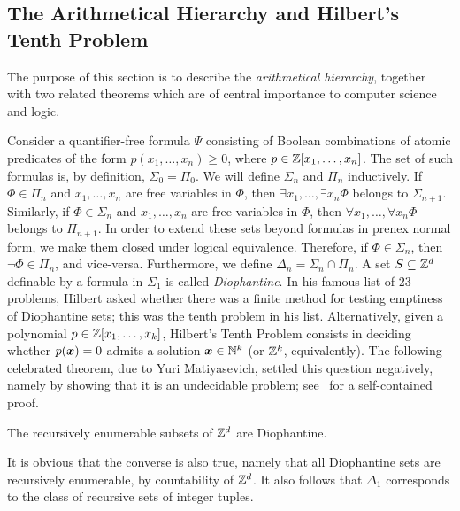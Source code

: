 \subsection{The Arithmetical Hierarchy and Hilbert's Tenth Problem}

The purpose of this section is to describe the \emph{arithmetical hierarchy}, together with two related theorems which are of central importance to computer science and logic.

Consider a quantifier-free formula $\Psi$ consisting of Boolean combinations of atomic predicates of the form $p(x_{1}, \ldots, x_{n}) \geq 0$, where $p \in \mathbb{Z}[x_{1}, \ldots, x_{n}]$.
The set of such formulas is, by definition, $\Sigma_{0}=\Pi_{0}$. We will define $\Sigma_{n}$ and $\Pi_{n}$ inductively.
If $\Phi \in \Pi_{n}$ and $x_{1}, \ldots, x_{n}$ are free variables in $\Phi$, then $\exists x_{1}, \ldots, \exists x_{n} \Phi$ belongs to $\Sigma_{n+1}$.
Similarly, if $\Phi \in \Sigma_{n}$ and $x_{1}, \ldots, x_{n}$ are free variables in $\Phi$, then $\forall x_{1}, \ldots, \forall x_{n} \Phi$ belongs to $\Pi_{n+1}$.
In order to extend these sets beyond formulas in prenex normal form, we make them closed under logical equivalence. Therefore, if $\Phi \in \Sigma_{n}$, then $\neg \Phi \in \Pi_{n}$, and vice-versa.
Furthermore, we define $\Delta_{n} = \Sigma_{n} \cap \Pi_{n}$.
A set $S \subseteq \mathbb{Z}^{d}$ definable by a formula in $\Sigma_{1}$ is called \emph{Diophantine}. In his famous list of 23 problems, Hilbert asked whether there was a finite method for testing emptiness of Diophantine sets; this was the tenth problem in his list. Alternatively, given a polynomial $p \in \mathbb{Z}[x_{1}, \ldots, x_{k}]$, Hilbert's Tenth Problem consists in deciding whether $p(\boldsymbol{x}) = 0$ admits a solution $\boldsymbol{x} \in \mathbb{N}^{k}$ (or $\mathbb{Z}^{k}$, equivalently). The following celebrated theorem, due to Yuri Matiyasevich, settled this question negatively, namely by showing that it is an undecidable problem; see~\cite{HTP} for a self-contained proof.

\begin{theorem}[Matiyasevich]
\label{thm:HTP}
The recursively enumerable subsets of $\mathbb{Z}^{d}$ are Diophantine.
\end{theorem}

It is obvious that the converse is also true, namely that all Diophantine sets are recursively enumerable, by countability of $\mathbb{Z}^{d}$. It also follows that $\Delta_{1}$ corresponds to the class of recursive sets of integer tuples.

